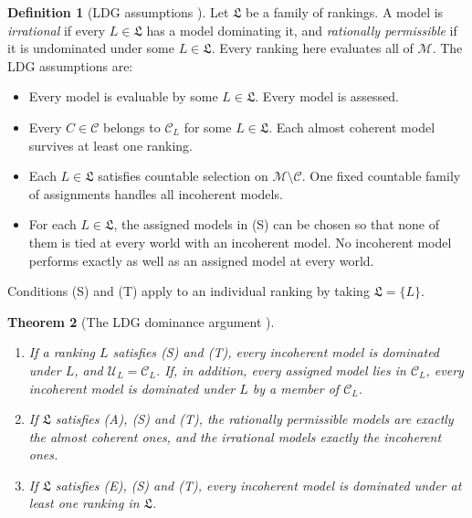 \documentclass[11pt]{article}
\newtheorem{theorem}{Theorem}[section]
\theoremstyle{definition}
\newtheorem{definition}[theorem]{Definition}
\newcommand{\M}{\mathcal M}
\newcommand{\C}{\mathcal C}
\newcommand{\U}{\mathcal U}
\newcommand{\Lf}{\mathfrak L}
\begin{document}
\begin{definition}[LDG assumptions {\cite{LDG}}]\label{def:argument}
Let $\Lf$ be a family of rankings. A model is \emph{irrational} if every $L\in\Lf$ has a model dominating it, and \emph{rationally permissible} if it is undominated under some $L\in\Lf$. Every ranking here evaluates all of $\M$. The LDG assumptions are:
\begin{itemize}[leftmargin=3.4em,labelsep=0.5em]
\item[\textbf{(E)}] Every model is evaluable by some $L\in\Lf$. Every model is assessed.
\item[\textbf{(A)}] Every $C\in\C$ belongs to $\C_L$ for some $L\in\Lf$. Each almost coherent model survives at least one ranking.
\begingroup\color{red}\item[\textbf{(S)}] Each $L\in\Lf$ satisfies countable selection on $\M\setminus\C$. One fixed countable family of assignments handles all incoherent models.
\item[\textbf{(T)}] For each $L\in\Lf$, the assigned models in (S) can be chosen so that none of them is tied at every world with an incoherent model. No incoherent model performs exactly as well as an assigned model at every world.
\endgroup
\end{itemize}
{\color{red}Conditions (S) and (T) apply to an individual ranking by taking $\Lf=\{L\}$.}
\end{definition}

\begin{theorem}[The LDG dominance argument {\cite{LDG}}]\label{thm:LDGargument}
\begin{enumerate}[label=(\alph*)]
\item If a ranking $L$ satisfies {\color{red}(S)} and {\color{red}(T)}, every incoherent model is dominated under $L$, and $\U_L=\C_L$. If, in addition, every assigned model lies in $\C_L$, every incoherent model is dominated under $L$ by a member of $\C_L$.
\item If $\Lf$ satisfies (A), {\color{red}(S)} and {\color{red}(T)}, the rationally permissible models are exactly the almost coherent ones, and the irrational models exactly the incoherent ones.
\item If $\Lf$ satisfies (E), {\color{red}(S)} and {\color{red}(T)}, every incoherent model is dominated under at least one ranking in $\Lf$.
\end{enumerate}
\end{theorem}
\end{document}
